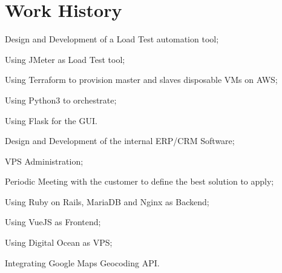 \documentclass[]{deedy-resume-openfont}
\begin{document}
\begin{minipage}[t]{0.65\textwidth} 

\section{Work History}

\vspace{\topsep} %
\begin{tightemize}
	\item Design and Development of a Load Test automation tool;
	\item Using JMeter as Load Test tool;
	\item Using Terraform to provision master and slaves disposable VMs on AWS;
	\item Using Python3 to orchestrate;
	\item Using Flask for the GUI.
\end{tightemize}
\sectionsep

\begin{tightemize}
\item Design and Development of the internal ERP/CRM Software;
\item VPS Administration;
\item Periodic Meeting with the customer to define the best solution to apply;
\item Using Ruby on Rails, MariaDB and Nginx as Backend;
\item Using VueJS as Frontend;
\item Using Digital Ocean as VPS;
\item Integrating Google Maps Geocoding API.
\end{tightemize}
\sectionsep


\end{minipage}
\end{document}
